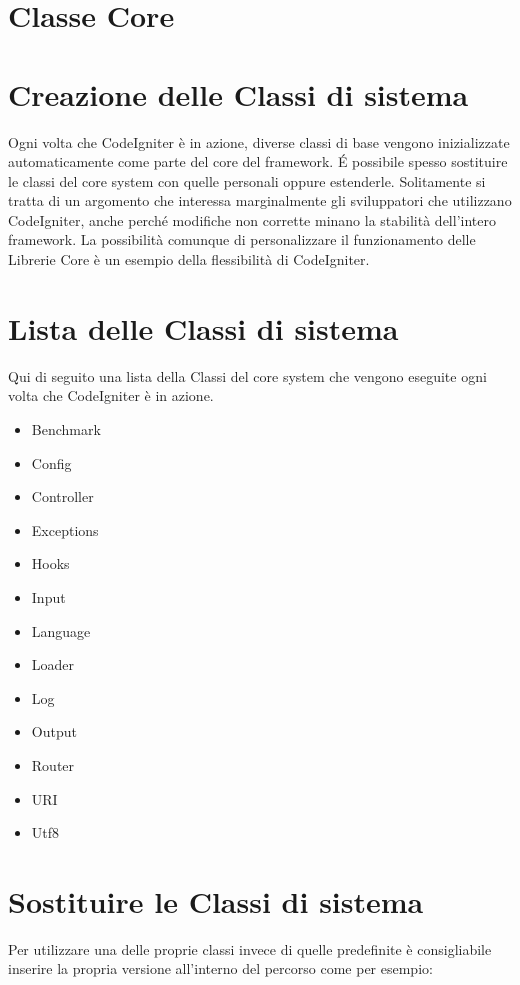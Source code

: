 \section{Classe Core}
\label{cap:classecore}

\section*{Creazione delle Classi di sistema}
Ogni volta che CodeIgniter è in azione, diverse classi di base vengono inizializzate automaticamente come parte del core del framework. \'E possibile spesso sostituire le classi del core system con quelle personali oppure estenderle. Solitamente si tratta di un argomento che interessa marginalmente gli sviluppatori che utilizzano CodeIgniter, anche perché modifiche non corrette minano la stabilità dell'intero framework. La possibilità comunque di personalizzare il funzionamento delle Librerie Core è un esempio della flessibilità di CodeIgniter.

\section*{Lista delle Classi di sistema}
Qui di seguito una lista della Classi del core system che vengono eseguite ogni volta che CodeIgniter è in azione.

\begin{itemize}
\item Benchmark
\item Config
\item Controller
\item Exceptions
\item Hooks
\item Input
\item Language
\item Loader
\item Log
\item Output
\item Router
\item URI
\item Utf8
\end{itemize}

\section*{Sostituire le Classi di sistema}
Per utilizzare una delle proprie classi invece di quelle predefinite è consigliabile inserire la propria versione all'interno del percorso  come per esempio:

